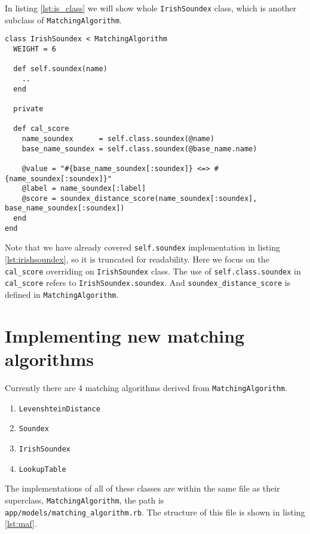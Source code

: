 In listing \ref{lst:is_class} we will show whole \texttt{IrishSoundex} class,
which is another subclass of \texttt{MatchingAlgorithm}.

\begin{minipage}{\linewidth}
  \begin{lstlisting}[label={lst:is_class}, caption={\texttt{IrishSoundex} class.}]
class IrishSoundex < MatchingAlgorithm
  WEIGHT = 6

  def self.soundex(name)
    ..
  end

  private

  def cal_score
    name_soundex      = self.class.soundex(@name)
    base_name_soundex = self.class.soundex(@base_name.name)

    @value = "#{base_name_soundex[:soundex]} <=> #{name_soundex[:soundex]}"
    @label = name_soundex[:label]
    @score = soundex_distance_score(name_soundex[:soundex], base_name_soundex[:soundex])
  end
end
\end{lstlisting}
\end{minipage}

Note that we have already covered \texttt{self.soundex} implementation
in listing \ref{lst:irishsoundex}, so it is truncated for readability.
Here we focus on the \texttt{cal\_score} overriding
on \texttt{IrishSoundex} class. The use of \texttt{self.class.soundex} in \texttt{cal\_score}
refers to \texttt{IrishSoundex.soundex}. And \texttt{soundex\_distance\_score}
is defined in \texttt{MatchingAlgorithm}.

\section{Implementing new matching algorithms}

Currently there are 4 matching algorithms derived from
\texttt{MatchingAlgorithm}.

\begin{enumerate}
  \item \texttt{LevenshteinDistance}
  \item \texttt{Soundex}
  \item \texttt{IrishSoundex}
  \item \texttt{LookupTable}
\end{enumerate}

The implementations of all of these classes are within the same file
as their superclass, \texttt{MatchingAlgorithm}, the path is\\
\texttt{app/models/matching\_algorithm.rb}. The structure of this file
is shown in listing \ref{lst:maf}.

